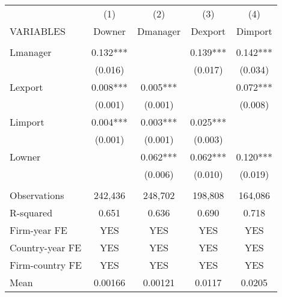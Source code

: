 \begin{tabular}{lcccc} \hline
 & (1) & (2) & (3) & (4) \\
VARIABLES & Downer & Dmanager & Dexport & Dimport \\ \hline
 &  &  &  &  \\
Lmanager & 0.132*** &  & 0.139*** & 0.142*** \\
 & (0.016) &  & (0.017) & (0.034) \\
Lexport & 0.008*** & 0.005*** &  & 0.072*** \\
 & (0.001) & (0.001) &  & (0.008) \\
Limport & 0.004*** & 0.003*** & 0.025*** &  \\
 & (0.001) & (0.001) & (0.003) &  \\
Lowner &  & 0.062*** & 0.062*** & 0.120*** \\
 &  & (0.006) & (0.010) & (0.019) \\
 &  &  &  &  \\
Observations & 242,436 & 248,702 & 198,808 & 164,086 \\
R-squared & 0.651 & 0.636 & 0.690 & 0.718 \\
Firm-year FE & YES & YES & YES & YES \\
Country-year FE & YES & YES & YES & YES \\
Firm-country FE & YES & YES & YES & YES \\
 Mean & 0.00166 & 0.00121 & 0.0117 & 0.0205 \\ \hline
\end{tabular}
